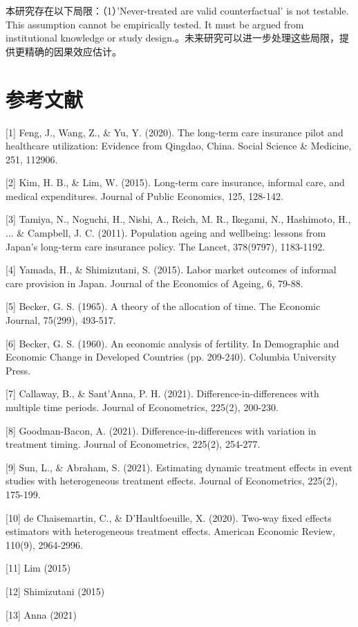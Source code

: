 \documentclass[11pt,a4paper]{article}
\begin{document}
本研究存在以下局限：（1）'Never-treated are valid counterfactual' is not testable. This assumption cannot be empirically tested. It must be argued from institutional knowledge or study design.。未来研究可以进一步处理这些局限，提供更精确的因果效应估计。

\section{参考文献}
[1] Feng, J., Wang, Z., \& Yu, Y. (2020). The long-term care insurance pilot and healthcare utilization: Evidence from Qingdao, China. Social Science \& Medicine, 251, 112906.

[2] Kim, H. B., \& Lim, W. (2015). Long-term care insurance, informal care, and medical expenditures. Journal of Public Economics, 125, 128-142.

[3] Tamiya, N., Noguchi, H., Nishi, A., Reich, M. R., Ikegami, N., Hashimoto, H., ... \& Campbell, J. C. (2011). Population ageing and wellbeing: lessons from Japan's long-term care insurance policy. The Lancet, 378(9797), 1183-1192.

[4] Yamada, H., \& Shimizutani, S. (2015). Labor market outcomes of informal care provision in Japan. Journal of the Economics of Ageing, 6, 79-88.

[5] Becker, G. S. (1965). A theory of the allocation of time. The Economic Journal, 75(299), 493-517.

[6] Becker, G. S. (1960). An economic analysis of fertility. In Demographic and Economic Change in Developed Countries (pp. 209-240). Columbia University Press.

[7] Callaway, B., \& Sant'Anna, P. H. (2021). Difference-in-differences with multiple time periods. Journal of Econometrics, 225(2), 200-230.

[8] Goodman-Bacon, A. (2021). Difference-in-differences with variation in treatment timing. Journal of Econometrics, 225(2), 254-277.

[9] Sun, L., \& Abraham, S. (2021). Estimating dynamic treatment effects in event studies with heterogeneous treatment effects. Journal of Econometrics, 225(2), 175-199.

[10] de Chaisemartin, C., \& D'Haultfoeuille, X. (2020). Two-way fixed effects estimators with heterogeneous treatment effects. American Economic Review, 110(9), 2964-2996.

[11] Lim (2015)

[12] Shimizutani (2015)

[13] Anna (2021)
\end{document}
